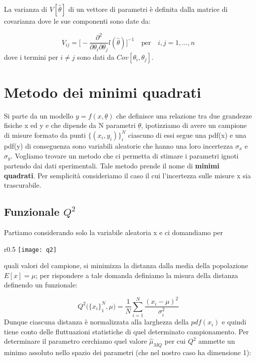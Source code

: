 La varianza di $V[\hat{\theta}]$ di un vettore di parametri \`{e} definita dalla matrice di covarianza dove le sue componenti sono date da:

\begin{equation}
	V_{ij} = \Big[ - \dfrac{\partial^2}{\partial \theta_i \partial \theta_j}l(\hat{\theta}) \Big]^{-1} \quad \text{per} \quad i,j = 1,...,n
\end{equation}
dove i termini per $i \neq j$ sono dati da $Cov[\theta_i,\theta_j]$.


\section{Metodo dei minimi quadrati}
Si parte da un modello $y = f(x,\underline{\theta})$ che definisce una relazione tra due grandezze fisiche x ed y e che dipende da N parametri $\underline{\theta}$, ipotizziamo di avere un campione di misure formato da punti $\{(x_i,y_i)\}_{i}^N$ ciascuno di essi segue una pdf(x) e una pdf(y) di conseguenza sono variabili aleatorie che hanno una loro incertezza $\sigma_x$ e $\sigma_y$. Vogliamo trovare un metodo che ci permetta di stimare i parametri ignoti partendo dai dati sperimentali. Tale metodo prende il nome di \textbf{minimi quadrati}. Per semplicit\`{a} consideriamo il caso il cui l'incertezza sulle misure x sia trascurabile.

\subsection{Funzionale $Q^2$}

\noindent Partiamo considerando solo la variabile aleatoria x  e ci domandiamo per 
\begin{wrapfigure}{r}{0.5 \textwidth}
\vspace{-10pt}
\centering
\texttt{[image: q2]}	
\end{wrapfigure}
quali valori del campione, si minimizza la distanza dalla media della popolazione $E[x] = \mu$; per rispondere a tale domanda definiamo la misura della distanza definendo un funzionale:
\newline

\begin{equation}
	Q^2\Big(\{x_i\}_1^N,\mu \Big) = \dfrac{1}{N}\sum_{i=1}^N\dfrac{(x_i - \mu)^2}{\sigma_i^2}
\end{equation}
\newline
Dunque ciascuna distanza \`{e} normalizzata alla larghezza della $pdf(x_i)$ e quindi tiene conto delle fluttuazioni statistiche di quel determinato campionamento.\newline
 Per determinare il  parametro cerchiamo quel valore $\hat{\mu}_{MQ}$ per cui $Q^2$ ammette un minimo assoluto nello spazio dei parametri (che nel nostro caso ha dimensione 1):


